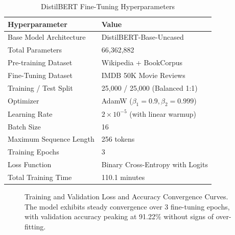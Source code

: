 \documentclass[conference]{IEEEtran}
\begin{document}
\begin{table}[t]
\caption{DistilBERT Fine-Tuning Hyperparameters}
\begin{center}
\begin{tabular}{ll}
\toprule
\textbf{Hyperparameter} & \textbf{Value} \\
\midrule
Base Model Architecture & DistilBERT-Base-Uncased \\
Total Parameters & 66,362,882 \\
Pre-training Dataset & Wikipedia + BookCorpus \\
Fine-Tuning Dataset & IMDB 50K Movie Reviews \\
Training / Test Split & 25,000 / 25,000 (Balanced 1:1) \\
Optimizer & AdamW ($\beta_1=0.9, \beta_2=0.999$) \\
Learning Rate & $2 \times 10^{-5}$ (with linear warmup) \\
Batch Size & 16 \\
Maximum Sequence Length & 256 tokens \\
Training Epochs & 3 \\
Loss Function & Binary Cross-Entropy with Logits \\
Total Training Time & 110.1 minutes \\
\bottomrule
\end{tabular}
\label{tab:hyperparams}
\end{center}
\end{table}

\begin{figure}[t]
\centering
{}
\caption{Training and Validation Loss and Accuracy Convergence Curves. The model exhibits steady convergence over 3 fine-tuning epochs, with validation accuracy peaking at 91.22\% without signs of over-fitting.}
\label{fig:training_curves}
\end{figure}
\end{document}
